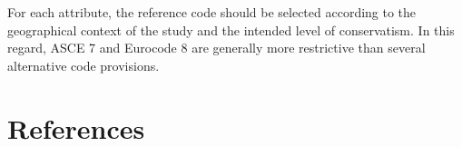 \begin{refsection}
For each attribute, the reference code should be selected according to the geographical context of the study and the intended level of conservatism. In this regard, ASCE 7 and Eurocode 8 are generally more restrictive than several alternative code provisions.


\FloatBarrier

\newpage

\renewcommand{\sectionnametext}{References}
\renewcommand{\headingtextR}{\thesection. \sectionnametext}
\section{\sectionnametext}
\printbibliography[heading=none]

\end{refsection}